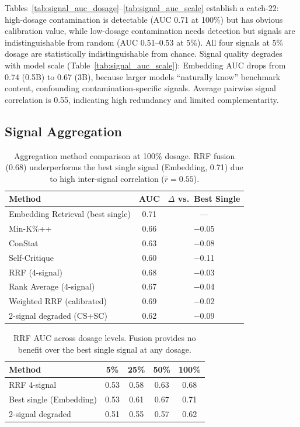 \documentclass[letterpaper,11pt]{article}
\begin{document}
Tables~\ref{tab:signal_auc_dosage}--\ref{tab:signal_auc_scale} establish a catch-22: high-dosage contamination is detectable (AUC 0.71 at 100\%) but has obvious calibration value, while low-dosage contamination needs detection but signals are indistinguishable from random (AUC 0.51--0.53 at 5\%).
All four signals at 5\% dosage are statistically indistinguishable from chance.
Signal quality degrades with model scale (Table~\ref{tab:signal_auc_scale}): Embedding AUC drops from 0.74 (0.5B) to 0.67 (3B), because larger models ``naturally know'' benchmark content, confounding contamination-specific signals.
Average pairwise signal correlation is 0.55, indicating high redundancy and limited complementarity.

\subsection{Signal Aggregation}
\label{sec:aggregation}

\begin{table}[t]
\centering
\caption{Aggregation method comparison at 100\% dosage. RRF fusion (0.68) underperforms the best single signal (Embedding, 0.71) due to high inter-signal correlation ($\bar{r}=0.55$).}
\label{tab:aggregation}
\begin{tabular}{@{}lcc@{}}
\toprule
Method & AUC & $\Delta$ vs.\ Best Single \\
\midrule
Embedding Retrieval (best single) & 0.71 & --- \\
Min-K\%++ & 0.66 & $-$0.05 \\
ConStat & 0.63 & $-$0.08 \\
Self-Critique & 0.60 & $-$0.11 \\
\midrule
RRF (4-signal) & 0.68 & $-$0.03 \\
Rank Average (4-signal) & 0.67 & $-$0.04 \\
Weighted RRF (calibrated) & 0.69 & $-$0.02 \\
2-signal degraded (CS+SC) & 0.62 & $-$0.09 \\
\bottomrule
\end{tabular}
\end{table}

\begin{table}[t]
\centering
\caption{RRF AUC across dosage levels. Fusion provides no benefit over the best single signal at any dosage.}
\label{tab:rrf_dosage}
\begin{tabular}{@{}lcccc@{}}
\toprule
Method & 5\% & 25\% & 50\% & 100\% \\
\midrule
RRF 4-signal & 0.53 & 0.58 & 0.63 & 0.68 \\
Best single (Embedding) & 0.53 & 0.61 & 0.67 & 0.71 \\
2-signal degraded & 0.51 & 0.55 & 0.57 & 0.62 \\
\bottomrule
\end{tabular}
\end{table}
\end{document}
